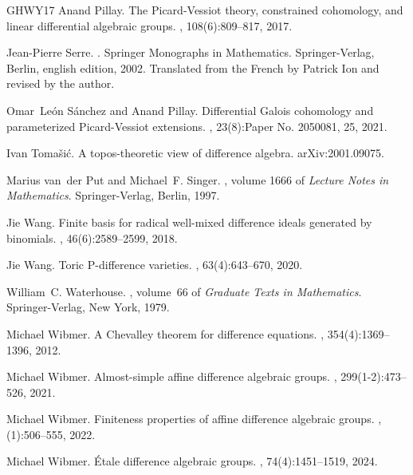 \documentclass[oneside,reqno]{amsart}
\theoremstyle{definition}
\begin{document}
\begin{thebibliography}{GHWY17}
Anand Pillay.
\newblock The {P}icard-{V}essiot theory, constrained cohomology, and linear
  differential algebraic groups.
, 108(6):809--817, 2017.

Jean-Pierre Serre.
.
\newblock Springer Monographs in Mathematics. Springer-Verlag, Berlin, english
  edition, 2002.
\newblock Translated from the French by Patrick Ion and revised by the author.

Omar~Le\'on S\'anchez and Anand Pillay.
\newblock Differential {G}alois cohomology and parameterized {P}icard-{V}essiot
  extensions.
, 23(8):Paper No. 2050081, 25, 2021.

Ivan Toma\v{s}i\'{c}.
\newblock A topos-theoretic view of difference algebra.
\newblock arXiv:2001.09075.

Marius van~der Put and Michael~F. Singer.
, volume 1666 of {\em
  Lecture Notes in Mathematics}.
\newblock Springer-Verlag, Berlin, 1997.

Jie Wang.
\newblock Finite basis for radical well-mixed difference ideals generated by
  binomials.
, 46(6):2589--2599, 2018.

Jie Wang.
\newblock Toric {P}-difference varieties.
, 63(4):643--670, 2020.

William~C. Waterhouse.
, volume~66 of {\em
  Graduate Texts in Mathematics}.
\newblock Springer-Verlag, New York, 1979.

Michael Wibmer.
\newblock A {C}hevalley theorem for difference equations.
, 354(4):1369--1396, 2012.

Michael Wibmer.
\newblock Almost-simple affine difference algebraic groups.
, 299(1-2):473--526, 2021.

Michael Wibmer.
\newblock Finiteness properties of affine difference algebraic groups.
, (1):506--555, 2022.

Michael Wibmer.
\newblock \'{E}tale difference algebraic groups.
, 74(4):1451--1519, 2024.

\end{thebibliography}
\end{document}
